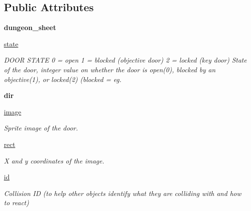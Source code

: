 \subsection*{Public Attributes}
\begin{DoxyCompactItemize}
\item 
\mbox{\label{classcollision_1_1door_1_1_door_a97c823f719c04f5bf8e5428e7b39b8b5}} 
{\bfseries dungeon\+\_\+sheet}
\item 
\hyperlink{classcollision_1_1door_1_1_door_a22802ca389469576ecc1418e8c3e20b8}{state}
\begin{DoxyCompactList}\small\item\em D\+O\+OR S\+T\+A\+TE 0 = open 1 = blocked (objective door) 2 = locked (key door) State of the door, integer value on whether the door is open(0), blocked by an objective(1), or locked(2) (blocked = eg. \end{DoxyCompactList}\item 
\mbox{\label{classcollision_1_1door_1_1_door_a0ff4b9ac39898923fae449e1ed392b8a}} 
{\bfseries dir}
\item 
\mbox{\label{classcollision_1_1door_1_1_door_a4d8b68c958e4ec059f2e99e53e76abf1}} 
\hyperlink{classcollision_1_1door_1_1_door_a4d8b68c958e4ec059f2e99e53e76abf1}{image}
\begin{DoxyCompactList}\small\item\em Sprite image of the door. \end{DoxyCompactList}\item 
\mbox{\label{classcollision_1_1door_1_1_door_a162269007487f8282278565e2f531a0c}} 
\hyperlink{classcollision_1_1door_1_1_door_a162269007487f8282278565e2f531a0c}{rect}
\begin{DoxyCompactList}\small\item\em X and y coordinates of the image. \end{DoxyCompactList}\item 
\mbox{\label{classcollision_1_1door_1_1_door_a101da4a463e317b8919c0bd1ad73b8df}} 
\hyperlink{classcollision_1_1door_1_1_door_a101da4a463e317b8919c0bd1ad73b8df}{id}
\begin{DoxyCompactList}\small\item\em Collision ID (to help other objects identify what they are colliding with and how to react) \end{DoxyCompactList}\end{DoxyCompactItemize}


